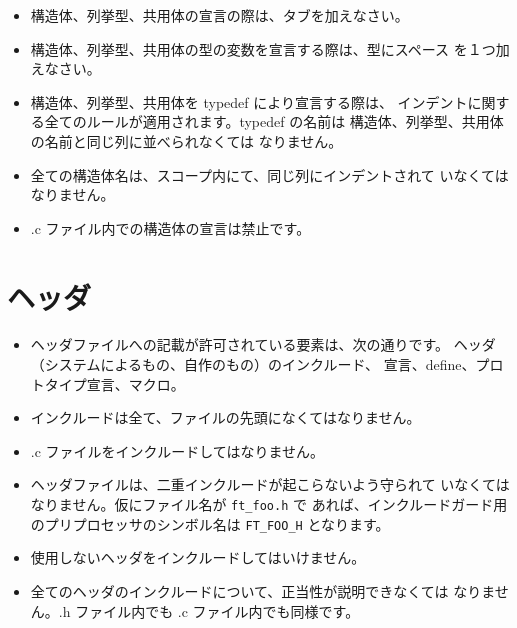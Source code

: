 \documentclass{42-ja}
\begin{document}
        \begin{itemize}

            \item 構造体、列挙型、共用体の宣言の際は、タブを加えなさい。

            \item 構造体、列挙型、共用体の型の変数を宣言する際は、型にスペース
				を１つ加えなさい。

            \item 構造体、列挙型、共用体を typedef により宣言する際は、
				インデントに関する全てのルールが適用されます。typedef の名前は
				構造体、列挙型、共用体の名前と同じ列に並べられなくては
				なりません。

            \item 全ての構造体名は、スコープ内にて、同じ列にインデントされて
				いなくてはなりません。

            \item .c ファイル内での構造体の宣言は禁止です。

        \end{itemize}
        \newpage


    \section{ヘッダ}

        \begin{itemize}

            \item ヘッダファイルへの記載が許可されている要素は、次の通りです。
				ヘッダ（システムによるもの、自作のもの）のインクルード、
				宣言、define、プロトタイプ宣言、マクロ。

            \item インクルードは全て、ファイルの先頭になくてはなりません。

            \item .c ファイルをインクルードしてはなりません。

            \item ヘッダファイルは、二重インクルードが起こらないよう守られて
				いなくてはなりません。仮にファイル名が \texttt{ft\_foo.h} で
				あれば、インクルードガード用のプリプロセッサのシンボル名は
				\texttt{FT\_FOO\_H} となります。

            \item 使用しないヘッダをインクルードしてはいけません。

            \item 全てのヘッダのインクルードについて、正当性が説明できなくては
				なりません。.h ファイル内でも .c ファイル内でも同様です。

        \end{itemize}
\end{document}
